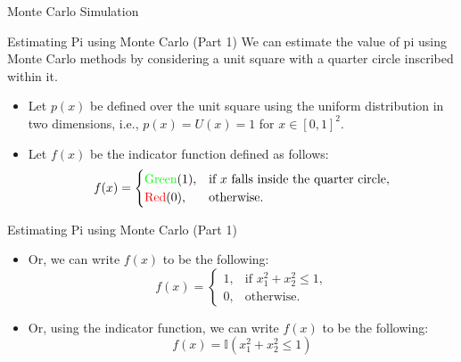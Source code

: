 \documentclass{beamer}
\begin{document}
\begin{section}{Monte Carlo Simulation}


    

    \begin{frame}[fragile]{Estimating Pi using Monte Carlo (Part 1)}
        We can estimate the value of pi using Monte Carlo methods by considering a unit square with a quarter circle inscribed within it.
        
        \begin{itemize}
           \pause \item Let $p(x)$ be defined over the unit square using the uniform distribution in two dimensions, i.e., $p(x) = U(x) = 1$ for $x \in [0, 1]^2$.
            \pause \item Let $f(x)$ be the indicator function defined as follows:
                \[
                f(x) = \begin{cases}
                            \text{\textcolor{green}{Green}} (1), & \text{if } x \text{ falls inside the quarter circle}, \\
                            \text{\textcolor{red}{Red}} (0), & \text{otherwise}.
                       \end{cases}
                \]
        \end{itemize}
    \end{frame}

    \begin{frame}[fragile]{Estimating Pi using Monte Carlo (Part 1)}

        \begin{itemize}
        \item Or, we can write $f(x)$ to be the following:
            \[
            f(x) = \begin{cases}
                        1, & \text{if } x_1^2 + x_2^2 \leq 1, \\
                        0, & \text{otherwise}.
                   \end{cases}
            \]
        \item Or, using the indicator function, we can write $f(x)$ to be the following:
            \[
            f(x) = \mathbb{I}(x_1^2 + x_2^2 \leq 1)
            \]
        \end{itemize}
        

\end{frame}
\end{section}
\end{document}
